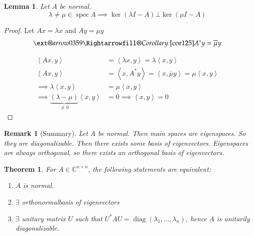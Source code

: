 \documentclass{article}
\makeatletter
\newcounter{lecref}[section]
\numberwithin{lecref}{section}
\newtheorem{theorem}[lecref]{Theorem}
\newtheorem{lemma}[lecref]{Lemma}
\newtheorem{remark}[lecref]{Remark}
\newcommand{\angel}[1]{\left\langle#1\right\rangle}
\newcommand{\xRightarrow}[2][]{\ext@arrow 0359\Rightarrowfill@{#1}{#2}}
\makeatother
\begin{document}
\begin{lemma} %
  Let $A$ be normal.
  \[ \lambda \neq \mu \in \operatorname{spec}{A} \implies \ker(\lambda I - A) \bot \ker(\mu I - A) \]
\end{lemma}

\begin{proof}
  Let $Ax = \lambda x$ and $Ay = \mu y$
  \[ \xRightarrow{Corollary~\ref{cor125}} A^* y = \overline{\mu} y \]

  \begin{align*}
    \angel{Ax,y} &= \angel{\lambda x, y} = \lambda \angel{x,y} \\
    \angel{Ax,y} &= \angel{x, A^* y} = \angel{x, \overline{\mu} y} = \mu \angel{x,y} \\
    \implies \lambda \angel{x,y} &= \mu \angel{x,y} \\
    \implies \underbrace{(\lambda - \mu)}_{\neq 0} \angel{x,y} &= 0 \implies \angel{x,y} = 0
  \end{align*}
\end{proof}

\begin{remark}[Summary]
  Let $A$ be normal. Then main spaces are eigenspaces.
  So they are diagonalizable. Then there exists some basis of eigenvectors.
  Eigenspaces are always orthogonal, so there exists an orthogonal basis of eigenvectors.
\end{remark}

\begin{theorem} %
  For $A \in \mathbb C^{n \times n}$, the following statements are equivalent:
  \begin{enumerate}
    \item $A$ is normal.
    \item $\exists$ orthonormalbasis of eigenvectors
    \item $\exists$ unitary matrix $U$ such that $U^* AU = \operatorname{diag}(\lambda_1, \dots, \lambda_n)$,
      hence $A$ is unitarily diagonalizable.
  \end{enumerate}
\end{theorem}
\end{document}
